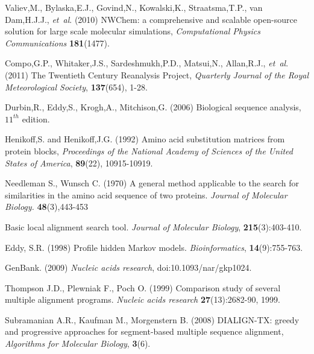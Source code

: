 \documentclass[phd,tocprelim]{cornell}
\begin{document}
\begin{thebibliography}{}
 Valiev,M., Bylaska,E.J., Govind,N., Kowalski,K., Straatsma,T.P., van Dam,H.J.J., {\it et~al}. (2010) NWChem: a comprehensive and scalable open-source solution for large scale molecular simulations, {\it Computational Physics Communications} {\bf 181}(1477).

 Compo,G.P., Whitaker,J.S., Sardeshmukh,P.D., Matsui,N., Allan,R.J., {\it et~al}. (2011) The Twentieth Century Reanalysis Project, {\it Quarterly Journal of the Royal Meteorological Society}, {\bf 137}(654), 1-28.




    Durbin,R., Eddy,S., Krogh,A., Mitchison,G. (2006) Biological sequence analysis, $11^{th}$ edition.

    Henikoff,S. and Henikoff,J.G. (1992) Amino acid substitution matrices from protein blocks, {\it Proceedings of the National Academy of Sciences of the United States of America}, {\bf 89}(22), 10915-10919.

Needleman S., Wunsch C. (1970) A general method applicable to the search for similarities in the amino acid sequence of two proteins.
\textit{Journal of Molecular Biology.} \textbf{48}(3),443-453

Basic local alignment search tool. \textit{Journal of Molecular Biology}, \textbf{215}(3):403-410.

Eddy, S.R. (1998) Profile hidden Markov models. \textit{Bioinformatics}, \textbf{14}(9):755-763.

GenBank. (2009) \textit{Nucleic acids research}, doi:10.1093/nar/gkp1024.

Thompson J.D., Plewniak F., Poch O. (1999) Comparison study of several multiple alignment programs.
\textit{Nucleic acids research} \textbf{27}(13):2682-90, 1999.

Subramanian A.R., Kaufman M., Morgenstern B. (2008) DIALIGN-TX: greedy and progressive approaches for segment-based multiple sequence alignment, {\it Algorithms for Molecular Biology}, {\bf 3}(6).


\end{thebibliography}
\end{document}
